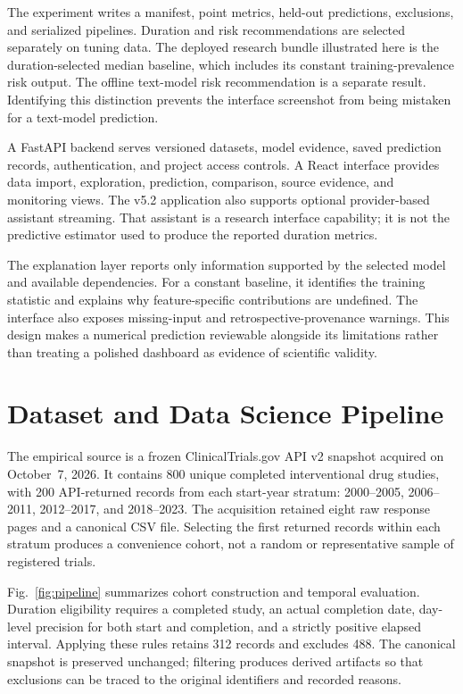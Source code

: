 \documentclass[10pt,letterpaper,twocolumn]{article}
\begin{document}
The experiment writes a manifest, point metrics, held-out predictions, exclusions, and serialized pipelines. Duration and risk recommendations are selected separately on tuning data. The deployed research bundle illustrated here is the duration-selected median baseline, which includes its constant training-prevalence risk output. The offline text-model risk recommendation is a separate result. Identifying this distinction prevents the interface screenshot from being mistaken for a text-model prediction.

A FastAPI backend serves versioned datasets, model evidence, saved prediction records, authentication, and project access controls. A React interface provides data import, exploration, prediction, comparison, source evidence, and monitoring views. The v5.2 application also supports optional provider-based assistant streaming. That assistant is a research interface capability; it is not the predictive estimator used to produce the reported duration metrics.

The explanation layer reports only information supported by the selected model and available dependencies. For a constant baseline, it identifies the training statistic and explains why feature-specific contributions are undefined. The interface also exposes missing-input and retrospective-provenance warnings. This design makes a numerical prediction reviewable alongside its limitations rather than treating a polished dashboard as evidence of scientific validity.

\section{Dataset and Data Science Pipeline}

The empirical source is a frozen ClinicalTrials.gov API v2 snapshot acquired on October~7, 2026. It contains 800 unique completed interventional drug studies, with 200 API-returned records from each start-year stratum: 2000--2005, 2006--2011, 2012--2017, and 2018--2023. The acquisition retained eight raw response pages and a canonical CSV file. Selecting the first returned records within each stratum produces a convenience cohort, not a random or representative sample of registered trials.

Fig.~\ref{fig:pipeline} summarizes cohort construction and temporal evaluation. Duration eligibility requires a completed study, an actual completion date, day-level precision for both start and completion, and a strictly positive elapsed interval. Applying these rules retains 312 records and excludes 488. The canonical snapshot is preserved unchanged; filtering produces derived artifacts so that exclusions can be traced to the original identifiers and recorded reasons.
\end{document}

